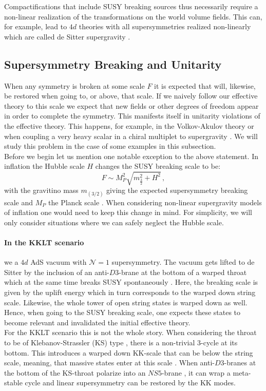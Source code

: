 \documentclass[12pt]{report}
\newcommand{\be}{\begin{equation}}
\newcommand{\ee}{\end{equation}}
\begin{document}
Compactifications that include SUSY breaking sources thus necessarily require a non-linear realization of the transformations on the world volume fields. This can, for example, lead to $4d$ theories with all supersymmetries realized non-linearly which are called de Sitter supergravity \cite{Antoniadis:2014oya,Dudas:2015eha,Bergshoeff:2015tra,Hasegawa:2015bza,Kallosh:2015sea,Schillo:2015ssx}.

\subsection{Supersymmetry Breaking and Unitarity}
When any symmetry is broken at some scale $F$ it is expected that will, likewise, be restored when going to, or above, that scale. If we naively follow our effective theory to this scale we expect that new fields or other degrees of freedom appear in order to complete the symmetry. This manifests itself in unitarity violations of the effective theory. This happens, for example, in the Volkov-Akulov theory \cite{Volkov:1972jx,Volkov:1973ix} or when coupling a very heavy scalar in a chiral multiplet to supergravity \cite{Casalbuoni:1988sx}. We will study this problem in the case of some examples in this subsection.\\
Before we begin let us mention one notable exception to the above statement. In inflation the Hubble scale $H$ changes the SUSY breaking scale to be:
\be 
F \sim M_P^2 \sqrt{m^2_{\frac{3}{2}} + H^2 } \,,
\ee
with the gravitino mass $m_{(3/2)}$ giving the expected supersymmetry breaking scale and $M_P$ the Planck scale \cite{Kallosh:2000ve,DallAgata:2014qsj,Ferrara:2015tyn,Carrasco:2015iij,Ferrara:2016een}. When considering non-linear supergravity models of inflation one would need to keep this change in mind. For simplicity, we will only consider situations where we can safely neglect the Hubble scale.

\paragraph{In the KKLT scenario} we a $4d$ AdS vacuum with $\mathcal{N}=1$ supersymmetry. The vacuum gets lifted to de Sitter by the inclusion of an anti-$D3$-brane at the bottom of a warped throat which at the same time breaks SUSY spontaneously \cite{Kachru:2003aw,Kachru:2003sx}. Here, the breaking scale is given by the uplift energy which in turn corresponds to the warped down string scale. Likewise, the whole tower of open string states is warped down as well. Hence, when going to the SUSY breaking scale, one expects these states to become relevant and invalidated the initial effective theory.\\
For the KKLT scenario this is not the whole story. When considering the throat to be of Klebanov-Strassler (KS) type \cite{Klebanov:2000hb}, there is a non-trivial 3-cycle at its bottom. This introduces a warped down KK-scale that can be below the string scale, meaning, that massive states enter at this scale \cite{Aalsma:2018pll}. When anti-$D3$-branes at the bottom of the KS-throat polarize into an $NS5$-brane \cite{Kachru:2002gs}, it can wrap a meta-stable cycle and linear supersymmetry can be restored by the KK modes.
\end{document}
